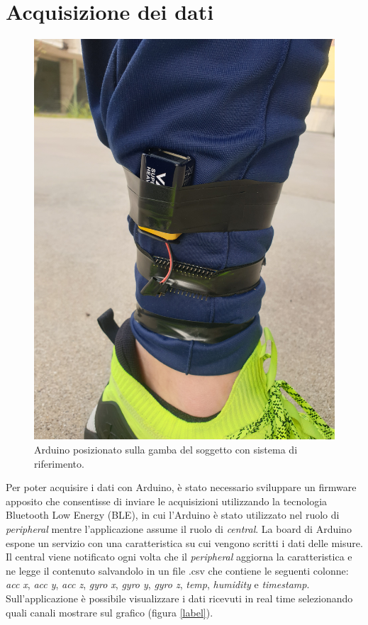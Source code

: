 \section{Acquisizione dei dati}
\begin{figure}[tbh]
	\centering
	\includegraphics[angle=-90, width=0.5\linewidth]{./ImageFiles/arduino_su_gamba.jpg}
	\caption{Arduino posizionato sulla gamba del soggetto con sistema di riferimento.}
	\label{fig:arduino_su_gamba}
\end{figure}
Per poter acquisire i dati con Arduino, è stato necessario sviluppare un firmware apposito che consentisse di inviare le acquisizioni utilizzando la tecnologia Bluetooth Low Energy (BLE), in cui l'Arduino è stato utilizzato nel ruolo di \textit{peripheral} mentre l'applicazione assume il ruolo di \textit{central}. La board di Arduino espone un servizio con una caratteristica su cui vengono scritti i dati delle misure. Il central viene notificato ogni volta che il \textit{peripheral} aggiorna la caratteristica e ne legge il contenuto salvandolo in un file .csv che contiene le seguenti colonne: \textit{acc x}, \textit{acc y}, \textit{acc z}, \textit{gyro x}, \textit{gyro y}, \textit{gyro z}, \textit{temp}, \textit{humidity} e \textit{timestamp}. Sull'applicazione è possibile visualizzare i dati ricevuti in real time selezionando quali canali mostrare sul grafico (figura \ref{label}).

